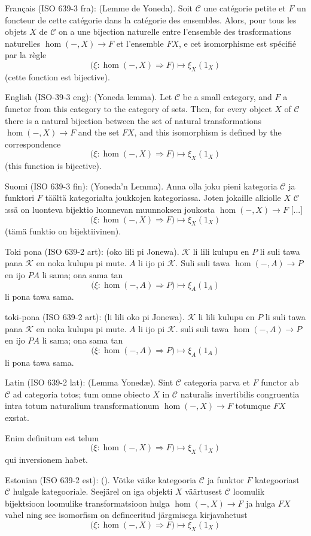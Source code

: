 \documentclass{article}
\newcommand{\tran}[3]{%
	\noindent\textsf{#1:} (#2). #3%
	\medskip\newline
}
\begin{document}
\tran{Français (ISO 639-3 fra)}{Lemme de Yoneda}{
	Soit $\mathcal C$ une catégorie petite et $F$ un foncteur de cette catégorie dans la catégorie des ensembles. Alors, pour tous les objets $X$ de $\mathcal C$ on a une bijection naturelle entre l'ensemble des trasformations naturelles $\hom(-,X)\to F$ et l'ensemble $FX$, e cet isomorphisme est spécifié par la règle
	\[
		\Big(\xi : \hom(-,X)\Rightarrow F\Big) \mapsto \xi_X(1_X)
	\]
	(cette fonction est bijective).
}
\tran{English (ISO-39-3 eng)}{Yoneda lemma}{
Let $\mathcal C$ be a small category, and $F$ a functor from this category to the category of sets. Then, for every object $X$ of $\mathcal C$ there is a natural bijection between the set of natural transformations $\hom(-,X)\to F$ and the set $FX$, and this isomorphism is defined by the correspondence
\[
	\Big(\xi : \hom(-,X)\Rightarrow F\Big) \mapsto \xi_X(1_X)
\]
(this function is bijective).
}
\tran{Suomi (ISO 639-3 fin)}{Yoneda'n Lemma}{
	Anna olla joku pieni kategoria $\mathcal C$ ja funktori $F$ täältä kategorialta joukkojen kategoriassa. Joten jokaille alkiolle $X$ $\mathcal C$:ssä on luonteva bijektio luonnevan muunnoksen joukosta $\hom(-,X)\to F$ [...]
	\[
		\Big(\xi : \hom(-,X)\Rightarrow F\Big) \mapsto \xi_X(1_X)
	\]
	(tämä funktio on bijektiivinen).
}
\tran{Toki pona (ISO 639-2 art)}{oko lili pi Jonewa}{$\mathcal K$ li lili kulupu en $P$ li suli tawa pana $\mathcal K$ en noka kulupu pi mute. $A$ li ijo pi $\mathcal K$. Suli suli tawa $\hom(-,A)\to P$ en ijo $PA$ li sama; ona sama tan
\[
	\Big(\xi : \hom(-,A)\Rightarrow P\Big) \mapsto \xi_A(1_A)
\]
li pona tawa sama.}
\tran{{\tp toki-pona} (ISO 639-2 art)}{{\tp li lili oko pi Jonewa}}{$\mathcal K$ {\tp li lili kulupu en} $P$ {\tp li suli tawa pana} $\mathcal K$ {\tp en noka kulupu pi mute}. $A$ {\tp li ijo pi} $\mathcal K$. {\tp suli suli tawa} $\hom(-,A)\to P$ {\tp en ijo} $PA$ {\tp li sama; ona sama tan}
\[
	\Big(\xi : \hom(-,A)\Rightarrow P\Big) \mapsto \xi_A(1_A)
\]
li pona tawa sama.}
\tran{Latin (ISO 639-2 lat)}{Lemma Yoned\ae}{
	Sint $\mathcal C$ categoria parva et $F$ functor ab $\mathcal C$ ad categoria totos; tum omne obiecto $X$ in $\mathcal C$ naturalis invertibilis congruentia intra totum naturalium transformationum $\hom(-,X)\to F$ totumque $FX$ exstat.

	Enim definitum est telum
\[
	\Big(\xi : \hom(-,X)\Rightarrow F\Big) \mapsto \xi_X(1_X)
\]
qui inversionem habet.
}
\tran{Estonian (ISO 639-2 est)}{}{
	Võtke väike kategooria $\mathcal C$ ja funktor $F$ kategooriast $\mathcal C$ hulgale kategooriale. Seejärel on iga objekti $X$ väärtusest $\mathcal C$ loomulik bijektsioon loomulike transformatsioon hulga $\hom(-,X)\to F$ ja hulga $FX$ vahel ning see isomorfism on defineeritud järgmisega kirjavahetust
	\[
	\Big(\xi : \hom(-,X)\Rightarrow F\Big) \mapsto \xi_X(1_X)
\]
}
\end{document}
